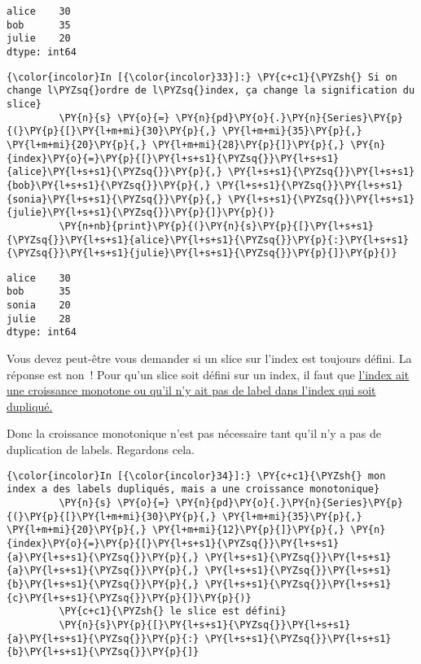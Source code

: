     \begin{Verbatim}[commandchars=\\\{\}]
alice    30
bob      35
julie    20
dtype: int64

    \end{Verbatim}

    \begin{Verbatim}[commandchars=\\\{\}]
{\color{incolor}In [{\color{incolor}33}]:} \PY{c+c1}{\PYZsh{} Si on change l\PYZsq{}ordre de l\PYZsq{}index, ça change la signification du slice}
         \PY{n}{s} \PY{o}{=} \PY{n}{pd}\PY{o}{.}\PY{n}{Series}\PY{p}{(}\PY{p}{[}\PY{l+m+mi}{30}\PY{p}{,} \PY{l+m+mi}{35}\PY{p}{,} \PY{l+m+mi}{20}\PY{p}{,} \PY{l+m+mi}{28}\PY{p}{]}\PY{p}{,} \PY{n}{index}\PY{o}{=}\PY{p}{[}\PY{l+s+s1}{\PYZsq{}}\PY{l+s+s1}{alice}\PY{l+s+s1}{\PYZsq{}}\PY{p}{,} \PY{l+s+s1}{\PYZsq{}}\PY{l+s+s1}{bob}\PY{l+s+s1}{\PYZsq{}}\PY{p}{,} \PY{l+s+s1}{\PYZsq{}}\PY{l+s+s1}{sonia}\PY{l+s+s1}{\PYZsq{}}\PY{p}{,} \PY{l+s+s1}{\PYZsq{}}\PY{l+s+s1}{julie}\PY{l+s+s1}{\PYZsq{}}\PY{p}{]}\PY{p}{)}
         \PY{n+nb}{print}\PY{p}{(}\PY{n}{s}\PY{p}{[}\PY{l+s+s1}{\PYZsq{}}\PY{l+s+s1}{alice}\PY{l+s+s1}{\PYZsq{}}\PY{p}{:}\PY{l+s+s1}{\PYZsq{}}\PY{l+s+s1}{julie}\PY{l+s+s1}{\PYZsq{}}\PY{p}{]}\PY{p}{)}
\end{Verbatim}


    \begin{Verbatim}[commandchars=\\\{\}]
alice    30
bob      35
sonia    20
julie    28
dtype: int64

    \end{Verbatim}

    Vous devez peut-être vous demander si un slice sur l'index est toujours
défini. La réponse est non~! Pour qu'un slice soit défini sur un index,
il faut que
\href{https://pandas.pydata.org/pandas-docs/stable/advanced.html\#non-monotonic-indexes-require-exact-matches}{l'index
ait une croissance monotone ou qu'il n'y ait pas de label dans l'index
qui soit dupliqué.}

Donc la croissance monotonique n'est pas nécessaire tant qu'il n'y a pas
de duplication de labels. Regardons cela.

    \begin{Verbatim}[commandchars=\\\{\}]
{\color{incolor}In [{\color{incolor}34}]:} \PY{c+c1}{\PYZsh{} mon index a des labels dupliqués, mais a une croissance monotonique}
         \PY{n}{s} \PY{o}{=} \PY{n}{pd}\PY{o}{.}\PY{n}{Series}\PY{p}{(}\PY{p}{[}\PY{l+m+mi}{30}\PY{p}{,} \PY{l+m+mi}{35}\PY{p}{,} \PY{l+m+mi}{20}\PY{p}{,} \PY{l+m+mi}{12}\PY{p}{]}\PY{p}{,} \PY{n}{index}\PY{o}{=}\PY{p}{[}\PY{l+s+s1}{\PYZsq{}}\PY{l+s+s1}{a}\PY{l+s+s1}{\PYZsq{}}\PY{p}{,} \PY{l+s+s1}{\PYZsq{}}\PY{l+s+s1}{a}\PY{l+s+s1}{\PYZsq{}}\PY{p}{,} \PY{l+s+s1}{\PYZsq{}}\PY{l+s+s1}{b}\PY{l+s+s1}{\PYZsq{}}\PY{p}{,} \PY{l+s+s1}{\PYZsq{}}\PY{l+s+s1}{c}\PY{l+s+s1}{\PYZsq{}}\PY{p}{]}\PY{p}{)}
         \PY{c+c1}{\PYZsh{} le slice est défini}
         \PY{n}{s}\PY{p}{[}\PY{l+s+s1}{\PYZsq{}}\PY{l+s+s1}{a}\PY{l+s+s1}{\PYZsq{}}\PY{p}{:} \PY{l+s+s1}{\PYZsq{}}\PY{l+s+s1}{b}\PY{l+s+s1}{\PYZsq{}}\PY{p}{]}
\end{Verbatim}


